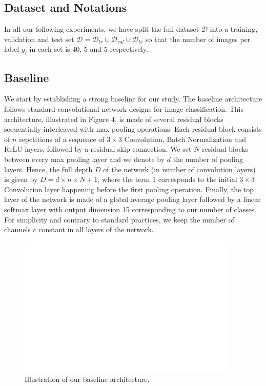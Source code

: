 \documentclass[10pt,twocolumn,letterpaper]{article}
\begin{document}
\subsection{Dataset and Notations}

In all our following experiments, we have split the full dataset $\mathcal{D}$ into a training, validation and test set $\mathcal{D}=\mathcal{D}_{tr} \cup \mathcal{D}_{val} \cup \mathcal{D}_{te}$ so that the number of images per label $y_i$ in each set is 40, 5 and 5 respectively.

\subsection{Baseline}

We start by establishing a strong baseline for our study.
The baseline architecture follows standard convolutional network designs for image classification.
This architecture, illustrated in Figure 4, is made of several residual blocks 
sequentially interleaved with max pooling operations.
Each residual block consists of $n$ repetitions of a sequence of 
$3 \times 3$ Convolution, Batch Normalization and ReLU layers,
followed by a residual skip connection.
We set $N$ residual blocks between every max pooling layer
and we denote by $d$ the number of pooling layers.
Hence, the full depth $D$ of the network (in number of convolution layers) 
is given by $D=d \times n \times N +1$, where the term $1$ corresponds to the
initial $3 \times 3$ Convolution layer happening before the first pooling operation.
Finally, the top layer of the network is made of a global average pooling layer 
followed by a linear softmax layer with output dimension 15 corresponding to our number of classes.
For simplicity and contrary to standard practices, we keep the number of channels $c$ constant 
in all layers of the network.

\begin{figure}[h]
	\centering
	\includegraphics[width=0.9\linewidth]{"./figures/Figure11"}
	\caption{
		Illustration of our baseline architecture.
	}
\end{figure}
\end{document}

